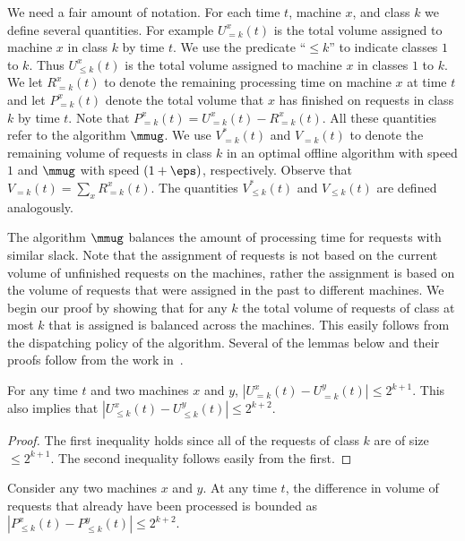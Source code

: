 We need a fair amount of notation. For each time $t$, machine $x$, and
class $k$ we define several quantities. For example $U^x_{=k}(t)$ is
the total volume assigned to machine $x$ in class $k$ by time $t$. We
use the predicate ``$\le k$'' to indicate classes $1$ to $k$.  Thus $U^x_{\le
  k}(t)$ is the total volume assigned to machine $x$ in classes $1$ to
$k$. We let $R^x_{=k}(t)$ to denote the remaining processing time on
machine $x$ at time $t$ and let $P^x_{=k}(t)$ denote the total volume
that $x$ has finished on requests in class $k$ by time $t$. Note that
$P^x_{=k}(t) = U^x_{=k}(t) - R^x_{=k}(t)$. All these quantities refer
to the algorithm $\mmug$. We use $V^*_{=k}(t)$ and $V_{=k}(t)$ to
denote the remaining volume of requests in class $k$ in an optimal
offline algorithm with speed $1$ and $\mmug$ with speed $(1+\eps)$,
respectively. Observe that $V_{=k}(t) = \sum_x R^x_{=k}(t)$.  The
quantities $V^*_{\le k}(t)$ and $V_{\le k}(t)$ are defined
analogously.

The algorithm $\mmug$ balances the amount of processing time for
requests with similar slack.  Note that the assignment of requests is
not based on the current volume of unfinished requests on the
machines, rather the assignment is based on the volume of requests
that were assigned in the past to different machines.  We begin our
proof by showing that for any $k$ the total volume of requests of
class at most $k$ that is assigned is balanced across the machines.
This easily follows from the dispatching policy of the
algorithm. Several of the lemmas below and their proofs
follow from the work in~\cite{AvrahamiA03,ChekuriGKK04}.

\begin{proposition}
\label{observation} 
For any time $t$ and two machines $x$ and $y$,
$|U^{x}_{=k}(t) - U^{y}_{=k}(t)| \leq 2^{k+1}$.  This also implies
that $|U^{x}_{\leq k}(t) - U^{y}_{\leq k}(t)| \leq 2^{k+2}$.
\end{proposition}
\begin{proof}
  The first inequality holds since all of the requests of class $k$
  are of size $\leq 2^{k+1}$.  The second inequality follows easily
  from the first.
\end{proof}




\begin{lemma}
  \label{lem:processbound} Consider any two machines $x$ and $y$.  At any time $t$, the
  difference in volume of requests that already have been
  processed is bounded as $|P^{x}_{\leq k} (t) - P^{y}_{\leq k} (t)|
  \leq 2^{k+2}$.
\end{lemma}

